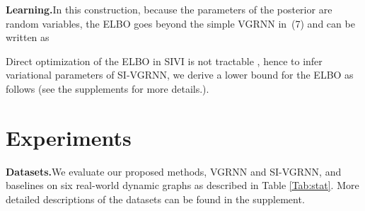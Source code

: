 \documentclass{article}
\begin{document}
\noindent \textbf{Learning.}\quad In this construction, because the parameters of the posterior are random variables, the ELBO goes beyond the simple VGRNN in~(7) and can be written as

Direct optimization of the ELBO in SIVI is not tractable \cite{yin2018semi}, hence to infer variational parameters of SI-VGRNN, we derive a lower bound for the ELBO as follows (see the supplements for more details.). 



\vspace{-0.1in}

\section{Experiments}
\noindent \textbf{Datasets.}\quad We evaluate our proposed methods, VGRNN and SI-VGRNN, and baselines on six real-world dynamic graphs as described in 
Table \ref{Tab:stat}. More detailed descriptions of the datasets can be found in the supplement.

\begin{table*}[t!]
\centering
\caption{Dataset statistics.\label{Tab:stat}}
\vspace{-0.5em}
\vspace{-0.5em}
\end{table*}
\end{document}
